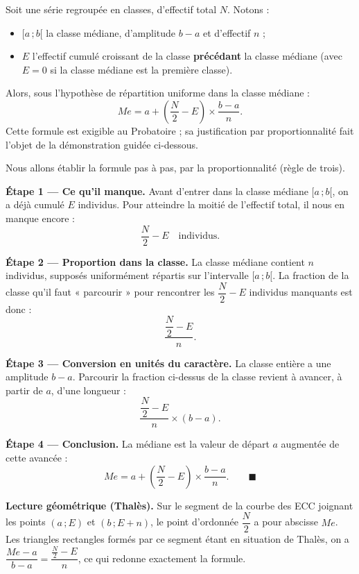 \documentclass[11pt]{article}
\begin{document}
\begin{propriete}
Soit une série regroupée en classes, d'effectif total $N$. Notons :
\begin{itemize}
\item $[a\,;b[$ la classe médiane, d'amplitude $b - a$ et d'effectif $n$ ;
\item $E$ l'effectif cumulé croissant de la classe \textbf{précédant} la classe médiane (avec $E = 0$ si la classe médiane est la première classe).
\end{itemize}
Alors, sous l'hypothèse de répartition uniforme dans la classe médiane :
\[ Me = a + \left(\dfrac{N}{2} - E\right) \times \dfrac{b - a}{n}. \]
Cette formule est exigible au Probatoire ; sa justification par proportionnalité fait l'objet de la démonstration guidée ci-dessous.
\end{propriete}

\begin{experience}
Nous allons établir la formule pas à pas, par la proportionnalité (règle de trois).

\textbf{Étape 1 — Ce qu'il manque.} Avant d'entrer dans la classe médiane $[a\,;b[$, on a déjà cumulé $E$ individus. Pour atteindre la moitié de l'effectif total, il nous en manque encore :
\[ \dfrac{N}{2} - E \quad \text{individus.} \]

\textbf{Étape 2 — Proportion dans la classe.} La classe médiane contient $n$ individus, supposés uniformément répartis sur l'intervalle $[a\,;b[$. La fraction de la classe qu'il faut « parcourir » pour rencontrer les $\dfrac{N}{2} - E$ individus manquants est donc :
\[ \dfrac{\dfrac{N}{2} - E}{n}. \]

\textbf{Étape 3 — Conversion en unités du caractère.} La classe entière a une amplitude $b - a$. Parcourir la fraction ci-dessus de la classe revient à avancer, à partir de $a$, d'une longueur :
\[ \dfrac{\dfrac{N}{2} - E}{n} \times (b - a). \]

\textbf{Étape 4 — Conclusion.} La médiane est la valeur de départ $a$ augmentée de cette avancée :
\[ Me = a + \left(\dfrac{N}{2} - E\right) \times \dfrac{b - a}{n}. \qquad \blacksquare \]

\textbf{Lecture géométrique (Thalès).} Sur le segment de la courbe des ECC joignant les points $(a\,;E)$ et $(b\,;E+n)$, le point d'ordonnée $\dfrac{N}{2}$ a pour abscisse $Me$. Les triangles rectangles formés par ce segment étant en situation de Thalès, on a $\dfrac{Me - a}{b - a} = \dfrac{\frac{N}{2} - E}{n}$, ce qui redonne exactement la formule.
\end{experience}
\end{document}
